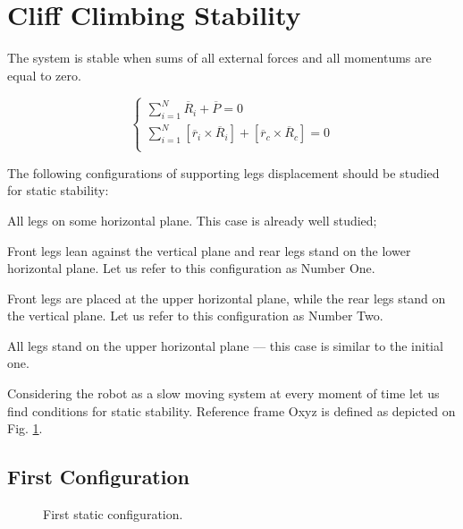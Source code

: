 \documentclass{ws-procs9x6}
\begin{document}

\section{Cliff Climbing Stability}
The system is stable when sums of all external forces and all momentums are equal to zero. 

\begin{equation}
  \left\{
    \begin{array}{cc}
    \sum\limits^N_{i=1}\overline{R}_i + \overline{P} = 0\\
    \sum\limits^N_{i=1}[\overline{r}_i\times\overline{R}_i] + [\overline{r}_c\times\overline{R}_c] = 0\\
    \end{array}
  \right.
  \label{eq:eq1}
\end{equation}

  
The following configurations of supporting legs displacement should be studied for static stability:
\begin{itemlist}
  \item All legs on some horizontal plane. This case is already well studied;
  \item Front legs lean against the vertical plane and rear legs stand on the lower horizontal plane. Let us refer to this configuration as Number One.
  \item Front legs are placed at the upper horizontal plane, while the rear legs stand on the vertical plane. Let us refer to this configuration as Number Two.
  \item All legs stand on the upper horizontal plane –-- this case is similar to the initial one.
\end{itemlist}
  
  Considering the robot as a slow moving system at every moment of time let us find conditions for static stability. 
  Reference frame Oxyz is defined as depicted on Fig. \ref{aba:configuration_1}.

\subsection{First Configuration}

\begin{figure}
  \begin{center}
  \end{center}
  \caption{First static configuration.}
  \label{aba:configuration_1}
\end{figure}
\end{document}

